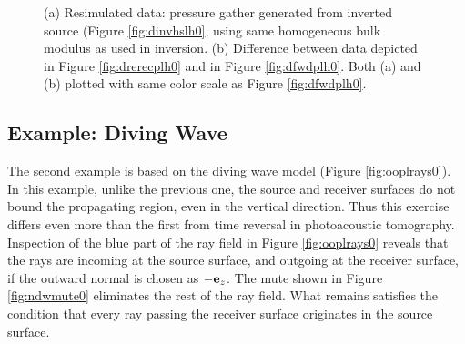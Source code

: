 \documentclass[georeport,12pt]{geophysics}
\begin{document}
\begin{figure}
  \centering
  \caption{(a) Resimulated data: pressure gather generated from
    inverted source (Figure \ref{fig:dinvhslh0}, using same
    homogeneous bulk modulus as used in inversion. (b) Difference
    between data depicted in Figure \ref{fig:drerecplh0} and in Figure \ref{fig:dfwdplh0}.
    Both (a) and (b) plotted with same color scale as Figure \ref{fig:dfwdplh0}.}
\end{figure}
  

\subsection{Example: Diving Wave}

The second example is based on the diving wave model (Figure
\ref{fig:ooplrays0}). In this example, unlike the previous one, the source
and receiver surfaces do not bound the propagating region, even in the
vertical direction. Thus this exercise differs even more than the
first from time reversal in photoacoustic tomography. Inspection of
the blue part of the ray field in Figure \ref{fig:ooplrays0} reveals that
the rays are incoming at the source surface, and outgoing at the receiver surface, if the
outward normal is chosen as $-{\bf e}_z$. The mute shown in Figure
\ref{fig:ndwmute0} eliminates the rest of the ray field. What remains
satisfies the condition that every ray passing the receiver surface
originates in the source surface.
\end{document}
